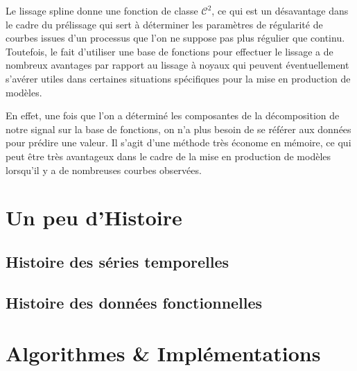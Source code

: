Le lissage spline donne une fonction de classe $\mathcal C^2$, ce qui est un désavantage dans le cadre du prélissage qui sert à déterminer les paramètres de régularité de courbes issues d'un processus que l'on ne suppose pas plus régulier que continu. Toutefois, le fait d'utiliser une base de fonctions pour effectuer le lissage a de nombreux avantages par rapport au lissage à noyaux qui peuvent éventuellement s'avérer utiles dans certaines situations spécifiques pour la mise en production de modèles.

En effet, une fois que l'on a déterminé les composantes de la décomposition de notre signal sur la base de fonctions, on n'a plus besoin de se référer aux données pour prédire une valeur. Il s'agit d'une méthode très économe en mémoire, ce qui peut être très avantageux dans le cadre de la mise en production de modèles lorsqu'il y a de nombreuses courbes observées.








\chapter{Un peu d'Histoire}
\label{annexe:histoire}
\section{ Histoire des séries temporelles }

\pagebreak
\section{ Histoire des données fonctionnelles }

\pagebreak
% 


\chapter{Algorithmes \& Implémentations}

\label{annexe:code}
